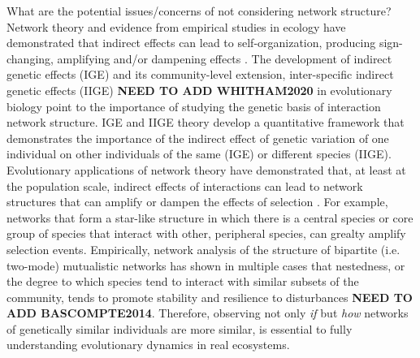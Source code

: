 \documentclass[11pt,twocolumn,twoside,lineno]{pnas-new}
\begin{document}
What are the potential issues/concerns of not considering network
structure? Network theory and evidence from empirical studies in
ecology have demonstrated that indirect effects can lead to
self-organization, producing sign-changing, amplifying and/or
dampening effects \cite{Newman2006, Sole2006}. The development of
indirect genetic effects (IGE) and its community-level extension,
inter-specific indirect genetic effects (IIGE)
\cite{Shuster2006COMMUNITYSTRUCTURE} \textbf{NEED TO ADD WHITHAM2020}
in evolutionary biology point to the importance of studying the
genetic basis of interaction network structure. IGE and IIGE theory
develop a quantitative framework that demonstrates the importance of
the indirect effect of genetic variation of one individual on other
individuals of the same (IGE) or different species
(IIGE). Evolutionary applications of network theory have demonstrated
that, at least at the population scale, indirect effects of
interactions can lead to network structures that can amplify or dampen
the effects of selection \cite{Lieberman2005}. For example, networks
that form a star-like structure in which there is a central species or
core group of species that interact with other, peripheral species,
can grealty amplify selection events. Empirically, network analysis of
the structure of bipartite (i.e. two-mode) mutualistic networks has
shown in multiple cases that nestedness, or the degree to which
species tend to interact with similar subsets of the community, tends
to promote stability and resilience to disturbances
\cite{Bascompte2006} \textbf{NEED TO ADD BASCOMPTE2014}. Therefore,
observing not only \textit{if} but \textit{how} networks of
genetically similar individuals are more similar, is essential to
fully understanding evolutionary dynamics in real ecosystems.
\end{document}
